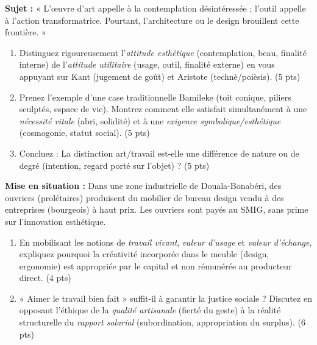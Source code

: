 \documentclass[11pt]{article}
\begin{document}
\begin{exercice}
\textbf{Sujet :} « L'œuvre d'art appelle à la contemplation désintéressée ; l'outil appelle à l'action transformatrice. Pourtant, l'architecture ou le design brouillent cette frontière. »
\begin{enumerate}
    \item Distinguez rigoureusement l'\textit{attitude esthétique} (contemplation, beau, finalité interne) de l'\textit{attitude utilitaire} (usage, outil, finalité externe) en vous appuyant sur Kant (jugement de goût) et Aristote (technè/poièsis). (5 pts)
    \item Prenez l'exemple d'une case traditionnelle Bamileke (toit conique, piliers sculptés, espace de vie). Montrez comment elle satisfait simultanément à une \textit{nécessité vitale} (abri, solidité) et à une \textit{exigence symbolique/esthétique} (cosmogonie, statut social). (5 pts)
    \item Concluez : La distinction art/travail est-elle une différence de nature ou de degré (intention, regard porté sur l'objet) ? (5 pts)
\end{enumerate}
\end{exercice}

\begin{exercice}
\textbf{Mise en situation :} Dans une zone industrielle de Douala-Bonabéri, des ouvriers (prolétaires) produisent du mobilier de bureau design vendu à des entreprises (bourgeois) à haut prix. Les ouvriers sont payés au SMIG, sans prime sur l'innovation esthétique.
\begin{enumerate}
    \item En mobilisant les notions de \textit{travail vivant}, \textit{valeur d'usage} et \textit{valeur d'échange}, expliquez pourquoi la créativité incorporée dans le meuble (design, ergonomie) est appropriée par le capital et non rémunérée au producteur direct. (4 pts)
    \item « Aimer le travail bien fait » suffit-il à garantir la justice sociale ? Discutez en opposant l'éthique de la \textit{qualité artisanale} (fierté du geste) à la réalité structurelle du \textit{rapport salarial} (subordination, appropriation du surplus). (6 pts)
\end{enumerate}
\end{exercice}
\end{document}
